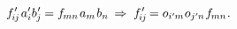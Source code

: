 \nopagebreak\vspace{-0.15em}\begin{equation*}
f\hspace{.1ex}'_{\hspace{-0.5ex}i\hspace{-0.1ex}j} \hspace{.2ex} a'_i b\hspace{.1ex}'_{\hspace{-0.2ex}j} \hspace{-0.1ex} = f_{\hspace{-0.1ex}mn} \hspace{.4ex} \tikzmark{beginComponentOfFirstVector} \hspace{-0.2ex} a_m \tikzmark{endComponentOfFirstVector} \hspace{.2ex} \tikzmark{beginComponentOfSecondVector} b_n \hspace{-0.2ex} \tikzmark{endComponentOfSecondVector}
\;\Rightarrow\;
f\hspace{.1ex}'_{\hspace{-0.5ex}i\hspace{-0.1ex}j} \hspace{-0.2ex} = \cosinematrix{i'\hspace{-0.1ex}m} \hspace{.1ex} \cosinematrix{j'\hspace{-0.1ex}n} \hspace{.16ex} f_{\hspace{-0.1ex}mn}
\hspace{.1ex} .
\end{equation*}

